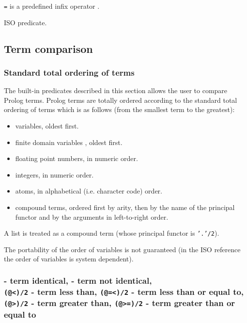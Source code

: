 \texttt{{\bs}=} is a predefined infix operator .

\PlErrorsNone

\Portability

ISO predicate.

\subsection{Term comparison}

\subsubsection{Standard total ordering of terms}
\label{Standard-total-ordering-of-terms}
The built-in predicates described in this section allows the user to compare
Prolog terms. Prolog terms are totally ordered according to the standard
total ordering of terms which is as follows (from the smallest term to the
greatest):

\begin{itemize}

\item variables, oldest first.

\item finite domain variables , oldest
first.

\item floating point numbers, in numeric order.

\item integers, in numeric order.

\item atoms, in alphabetical (i.e. character code) order.

\item compound terms, ordered first by arity, then by the name of the
principal functor and by the arguments in left-to-right order.

\end{itemize}

A list is treated as a compound term (whose principal functor is
\texttt{'.'/2}).

The portability of the order of variables is not guaranteed (in the ISO
reference the order of variables is system dependent).

\subsubsection{ - term identical, \label{(==)/2}
                - term not identical, \\
               \texttt{(@<)/2} - term less than,
               \texttt{(@=<)/2} - term less than or equal to, \\
               \texttt{(@>)/2} - term greater than,
               \texttt{(@>=)/2} - term greater than or equal to}

